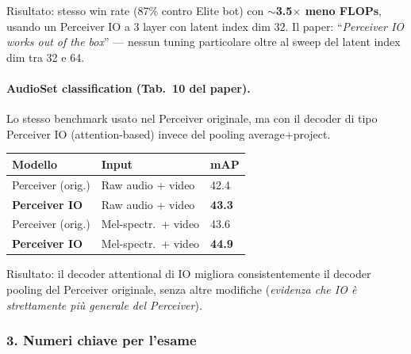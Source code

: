 \documentclass[
  11pt,
]{article}
\begin{document}
Risultato: stesso win rate (87\% contro Elite bot) con \textbf{$\sim$3.5$\times$ meno FLOPs}, usando un Perceiver IO a 3 layer con latent index dim $32$. Il paper: ``\emph{Perceiver IO works out of the box}'' --- nessun tuning particolare oltre al sweep del latent index dim tra 32 e 64.

\paragraph{AudioSet classification (Tab.\ 10 del paper).} Lo stesso benchmark usato nel Perceiver originale, ma con il decoder di tipo Perceiver IO (attention-based) invece del pooling average+project.

{\small
\begin{longtable}{@{}p{4.5cm} p{3cm} p{2cm}@{}}
\toprule
\textbf{Modello} & \textbf{Input} & \textbf{mAP} \\
\midrule
\endhead
Perceiver (orig.) & Raw audio + video & 42.4 \\[2pt]
\textbf{Perceiver IO} & Raw audio + video & \textbf{43.3} \\[2pt]
Perceiver (orig.) & Mel-spectr.\ + video & 43.6 \\[2pt]
\textbf{Perceiver IO} & Mel-spectr.\ + video & \textbf{44.9} \\
\bottomrule
\end{longtable}
}

Risultato: il decoder attentional di IO migliora consistentemente il decoder pooling del Perceiver originale, senza altre modifiche (\emph{evidenza che IO è strettamente più generale del Perceiver}).

\subsubsection*{3. Numeri chiave per l'esame}
\end{document}
